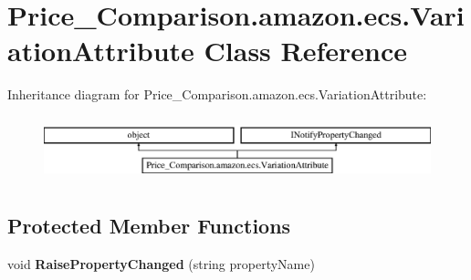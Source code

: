 \hypertarget{class_price___comparison_1_1amazon_1_1ecs_1_1_variation_attribute}{\section{Price\-\_\-\-Comparison.\-amazon.\-ecs.\-Variation\-Attribute Class Reference}
\label{class_price___comparison_1_1amazon_1_1ecs_1_1_variation_attribute}
}


 


Inheritance diagram for Price\-\_\-\-Comparison.\-amazon.\-ecs.\-Variation\-Attribute\-:\begin{figure}[H]
\begin{center}
\leavevmode
\includegraphics[height=1.885522cm]{class_price___comparison_1_1amazon_1_1ecs_1_1_variation_attribute}
\end{center}
\end{figure}
\subsection*{Protected Member Functions}
\begin{DoxyCompactItemize}
\item 
\hypertarget{class_price___comparison_1_1amazon_1_1ecs_1_1_variation_attribute_a53aac647d2f08a25cecca6202f6810e6}{void {\bfseries Raise\-Property\-Changed} (string property\-Name)}\label{class_price___comparison_1_1amazon_1_1ecs_1_1_variation_attribute_a53aac647d2f08a25cecca6202f6810e6}

\end{DoxyCompactItemize}
